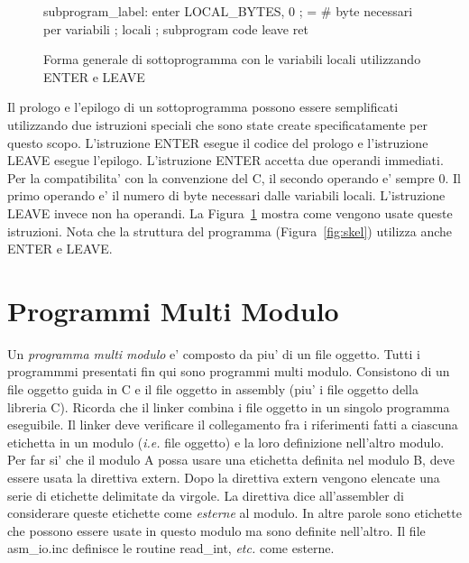 \begin{figure}[t]
\begin{AsmCodeListing}[frame=single]
subprogram_label:
      enter  LOCAL_BYTES, 0  ; = # byte necessari per variabili
                             ; locali
; subprogram code
      leave
      ret
\end{AsmCodeListing}
\caption{Forma generale di sottoprogramma con le variabili locali utilizzando 
{\code ENTER} e {\code LEAVE}\label{fig:subskel3}}
\end{figure}

Il prologo e l'epilogo di un sottoprogramma possono essere semplificati
utilizzando due istruzioni speciali che sono state create specificatamente
per questo scopo. L'istruzione {\code ENTER} esegue il codice del prologo
e l'istruzione {\code LEAVE} esegue l'epilogo. L'istruzione {\code ENTER} 
accetta due operandi immediati. Per la compatibilita' con la convenzione
del C, il secondo operando e' sempre 0. Il primo operando e' il numero
di byte necessari dalle variabili locali. L'istruzione {\code LEAVE} invece
non ha operandi. La Figura~\ref{fig:subskel3} mostra come vengono usate
queste istruzioni. Nota che la struttura del programma (Figura~\ref{fig:skel})
utilizza anche {\code ENTER} e {\code LEAVE}.

\section{Programmi Multi Modulo}

Un \emph{programma multi modulo} e' composto da piu' di un file oggetto.
Tutti i programmmi presentati fin qui sono programmi multi modulo.
Consistono di un file oggetto guida in C e il file oggetto in assembly
(piu' i file oggetto della libreria C). Ricorda che il linker combina
i file oggetto in un singolo programma eseguibile. Il linker deve
verificare il collegamento fra i riferimenti fatti a ciascuna etichetta 
in un modulo (\emph{i.e.} file oggetto) e la loro definizione nell'altro
modulo. Per far si' che il modulo A possa usare una etichetta definita
nel modulo B, deve essere usata la direttiva {\code extern}. Dopo la
direttiva {\code extern} vengono elencate una
serie di etichette delimitate da virgole. La direttiva dice all'assembler
di considerare queste etichette come \emph{esterne} al modulo. In altre
parole sono etichette che possono essere usate in questo modulo ma sono
definite nell'altro. Il file {\code asm\_io.inc} definisce le routine
{\code read\_int}, \emph{etc.} come esterne.

